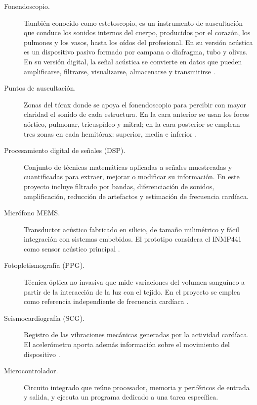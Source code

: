\begin{description}

\item[Fonendoscopio.] También conocido como estetoscopio, es un instrumento de auscultación que conduce los sonidos internos del cuerpo, producidos por el corazón, los pulmones y los vasos, hasta los oídos del profesional. En su versión acústica es un dispositivo pasivo formado por campana o diafragma, tubo y olivas. En su versión digital, la señal acústica se convierte en datos que pueden amplificarse, filtrarse, visualizarse, almacenarse y transmitirse \cite{Littmann2020}.

\item[Puntos de auscultación.] Zonas del tórax donde se apoya el fonendoscopio para percibir con mayor claridad el sonido de cada estructura. En la cara anterior se usan los focos aórtico, pulmonar, tricuspídeo y mitral; en la cara posterior se emplean tres zonas en cada hemitórax: superior, media e inferior \cite{AlNaggar2018}.

\item[Procesamiento digital de señales (DSP).] Conjunto de técnicas matemáticas aplicadas a señales muestreadas y cuantificadas para extraer, mejorar o modificar su información. En este proyecto incluye filtrado por bandas, diferenciación de sonidos, amplificación, reducción de artefactos y estimación de frecuencia cardíaca.

\item[Micrófono MEMS.] Transductor acústico fabricado en silicio, de tamaño milimétrico y fácil integración con sistemas embebidos. El prototipo considera el INMP441 como sensor acústico principal \cite{INMP441}.

\item[Fotopletismografía (PPG).] Técnica óptica no invasiva que mide variaciones del volumen sanguíneo a partir de la interacción de la luz con el tejido. En el proyecto se emplea como referencia independiente de frecuencia cardíaca \cite{MAX30102}.

\item[Seismocardiografía (SCG).] Registro de las vibraciones mecánicas generadas por la actividad cardíaca. El acelerómetro aporta además información sobre el movimiento del dispositivo \cite{MPU6050,Centracchio2023}.

\item[Microcontrolador.] Circuito integrado que reúne procesador, memoria y periféricos de entrada y salida, y ejecuta un programa dedicado a una tarea específica.

\end{description}

